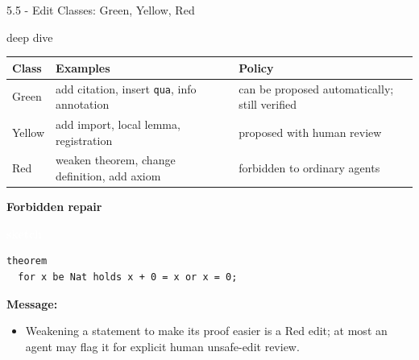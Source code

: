 \documentclass[aspectratio=169,11pt]{beamer}
\newcommand{\statusbadge}[2]{\colorbox{#1}{\textcolor{white}{\strut\scriptsize\sffamily\bfseries #2}}}
\newcommand{\badgeSketch}{\statusbadge{orange!75!black}{sketch}}
\newcommand{\deepdivetag}{\hfill\colorbox{black!15}{\textcolor{black!65}{\strut\scriptsize\sffamily deep dive}}}
\begin{document}
\begin{frame}[fragile,t]{5.5 - Edit Classes: Green, Yellow, Red\deepdivetag}
\begin{footnotesize}
\setlength{\tabcolsep}{3pt}
\renewcommand{\arraystretch}{1.15}
\begin{tabularx}{\textwidth}{>{\raggedright\arraybackslash}X>{\raggedright\arraybackslash}X>{\raggedright\arraybackslash}X}
\toprule
\textbf{Class} & \textbf{Examples} & \textbf{Policy} \\
\midrule
Green & add citation, insert \texttt{qua}, info annotation & can be proposed automatically; still verified \\
Yellow & add import, local lemma, registration & proposed with human review \\
Red & weaken theorem, change definition, add axiom & forbidden to ordinary agents \\
\bottomrule
\end{tabularx}
\end{footnotesize}

\smallskip
\textbf{Forbidden repair}~\badgeSketch
\begin{lstlisting}[language={mizar},basicstyle=\ttfamily\small]
theorem
  for x be Nat holds x + 0 = x or x = 0;
\end{lstlisting}
\smallskip
\textbf{Message:}
\begin{itemize}
\setlength{\itemsep}{1pt}
\setlength{\parsep}{0pt}
\setlength{\parskip}{0pt}
\item Weakening a statement to make its proof easier is a Red edit; at most an agent may flag it for explicit human unsafe-edit review.
\end{itemize}
\end{frame}
\end{document}
